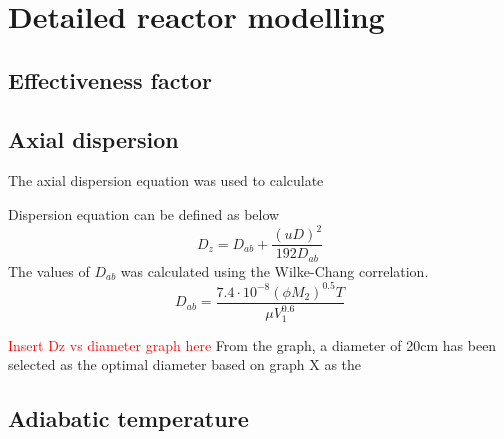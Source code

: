 \section{Detailed reactor modelling}
\subsection{Effectiveness factor}

\subsection{Axial dispersion}
The axial dispersion equation was used to calculate 

Dispersion equation can be defined as below
\begin{equation}
    D_z=D_{ab}+\frac{(uD)^2}{192D_{ab}}
    \label{axial dispersion coefficient}
\end{equation}
The values of $D_{ab}$ was calculated using the Wilke-Chang correlation.
\begin{equation}
    D_{ab}=\frac{7.4\cdot 10^{-8}(\phi M_2)^{0.5}T}{\mu V_1^{0.6}}
    \label{wilkechang}
\end{equation}


\textcolor{red}{Insert Dz vs diameter graph here} 
From the graph, a diameter of 20cm has been selected as the optimal diameter based on graph X as the  
\subsection{Adiabatic temperature}